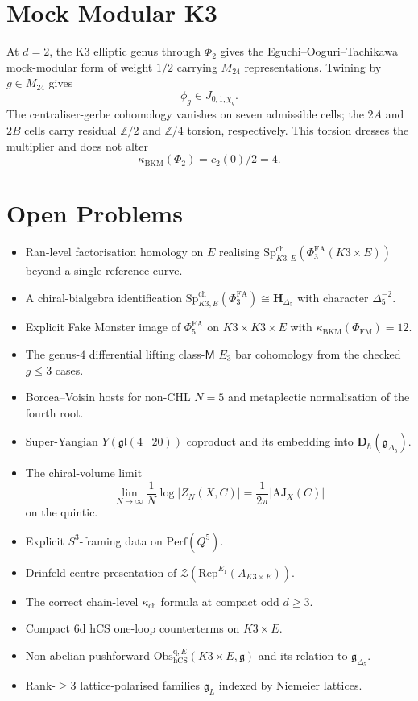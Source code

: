 \documentclass[11pt]{article}
\providecommand{\Z}{\mathbb{Z}}
\providecommand{\kch}{\kappa_{\mathrm{ch}}}
\providecommand{\kBKM}{\kappa_{\mathrm{BKM}}}
\providecommand{\Eone}{E_1}
\providecommand{\hCS}{\mathrm{hCS}}
\providecommand{\AJ}{\mathrm{AJ}}
\providecommand{\fg}{\mathfrak{g}}
\providecommand{\fgl}{\mathfrak{gl}}
\providecommand{\Perf}{\mathrm{Perf}}
\providecommand{\Phifa}{\Phi^{\mathrm{FA}}}
\providecommand{\Rep}{\mathrm{Rep}}
\providecommand{\cZ}{\mathcal{Z}}
\providecommand{\fgDel}{\fg_{\Delta_5}}
\providecommand{\Obs}{\mathrm{Obs}}
\theoremstyle{plain}
\theoremstyle{definition}
\theoremstyle{remark}
\begin{document}
\section{Mock Modular K3}

At $d=2$, the K3 elliptic genus through $\Phi_2$ gives the
Eguchi--Ooguri--Tachikawa mock-modular form of weight $1/2$ carrying
$M_{24}$ representations.  Twining by $g\in M_{24}$ gives
\[
  \phi_g\in J_{0,1,\chi_g}.
\]
The centraliser-gerbe cohomology vanishes on seven admissible cells;
the $2A$ and $2B$ cells carry residual $\Z/2$ and $\Z/4$ torsion,
respectively.  This torsion dresses the multiplier and does not alter
\[
  \kBKM(\Phi_2)=c_2(0)/2=4.
\]

\section{Open Problems}

\begin{itemize}[leftmargin=2em]
\item Ran-level factorisation homology on $E$ realising
$\mathrm{Sp}^{\mathrm{ch}}_{K3,E}(\Phifa_3(K3\times E))$ beyond a
single reference curve.
\item A chiral-bialgebra identification
$\mathrm{Sp}^{\mathrm{ch}}_{K3,E}(\Phifa_3)\cong
\mathbf H_{\Delta_5}$ with character $\Delta_5^{-2}$.
\item Explicit Fake Monster image of $\Phifa_5$ on
$K3\times K3\times E$ with $\kBKM(\Phi_{\mathrm{FM}})=12$.
\item The genus-$4$ differential lifting class-$\mathsf M$
$E_3$ bar cohomology from the checked $g\leq 3$ cases.
\item Borcea--Voisin hosts for non-CHL $N=5$ and metaplectic
normalisation of the fourth root.
\item Super-Yangian $Y(\fgl(4\mid 20))$ coproduct and its embedding
into $\mathbf D_\hbar(\fgDel)$.
\item The chiral-volume limit
\[
  \lim_{N\to\infty}\frac{1}{N}\log |Z_N(X,C)|
  =\frac{1}{2\pi}|\AJ_X(C)|
\]
on the quintic.
\item Explicit $S^3$-framing data on $\Perf(Q^5)$.
\item Drinfeld-centre presentation of
$\cZ(\Rep^{\Eone}(A_{K3\times E}))$.
\item The correct chain-level $\kch$ formula at compact odd
$d\geq 3$.
\item Compact $6$d $\hCS$ one-loop counterterms on $K3\times E$.
\item Non-abelian pushforward
$\Obs_{\hCS}^{\mathrm{q},E}(K3\times E,\fg)$ and its relation to
$\fgDel$.
\item Rank-$\geq 3$ lattice-polarised families $\fg_L$ indexed by
Niemeier lattices.
\end{itemize}
\end{document}
